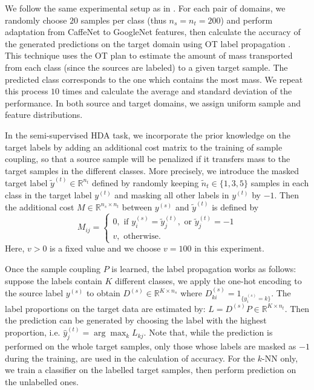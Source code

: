 We follow the same experimental setup as in \citep{Redko20}. For each pair of domains,
we randomly choose $20$ samples per class (thus $n_s = n_t = 200$) and
perform adaptation from CaffeNet to GoogleNet features, then calculate the
accuracy of the generated predictions on the target domain using OT label propagation \citep{Redko19a}.
This technique uses the OT plan to estimate the amount of mass transported from each class
(since the sources are labeled) to a given target sample.
The predicted class corresponds to the one which contains the most mass.
We repeat this process $10$ times and calculate the average and standard deviation of the performance.
In both source and target domains, we assign uniform sample and feature distributions.

In the semi-supervised HDA task, we incorporate the prior knowledge on the target labels by adding an
additional cost matrix to the training of sample coupling, so that a source sample
will be penalized if it transfers mass to the target samples in the different classes.
More precisely, we introduce the masked target label $\tilde{y}^{(t)} \in \mathbb R^{n_t}$
defined by randomly keeping $\tilde{n}_t \in \{1,3,5\}$ samples in each class
in the target label $y^{(t)}$ and masking all other labels in $y^{(t)}$ by $-1$.
Then the additional cost $M \in \mathbb R^{n_s \times n_t}$ between $y^{(s)}$
and $\tilde{y}^{(t)}$ is defined by
\begin{equation}
  M_{ij} =
  \begin{cases}
    0, \text{ if } y^{(s)}_i = \tilde{y}^{(t)}_j, \text{ or } \tilde{y}^{(t)}_j = -1 \\
    v, \text{ otherwise}.
  \end{cases}
\end{equation}
Here, $v > 0$ is a fixed value and we choose $v = 100$ in this experiment.

Once the sample coupling $P$ is learned, the label propagation works as follows:
suppose the labels contain $K$ different classes,
we apply the one-hot encoding to the source label $y^{(s)}$ to obtain
$D^{(s)} \in \mathbb R^{K \times n_s}$ where $D^{(s)}_{ki} = 1_{\{y^{(s)}_i = k\}}$.
The label proportions on the target data are estimated by:
$L = D^{(s)} P \in \mathbb R^{K \times n_t}$. Then the prediction can be generated by choosing the
label with the highest proportion, i.e. $\widehat{y}^{(t)}_j = \arg\max_k L_{kj}$.
Note that, while the prediction is performed on the whole target samples,
only those whose labels are masked as $-1$ during the
training, are used in the calculation of accuracy. For the $k$-NN only,
we train a classifier on the labelled target samples, then perform prediction on the unlabelled ones.


